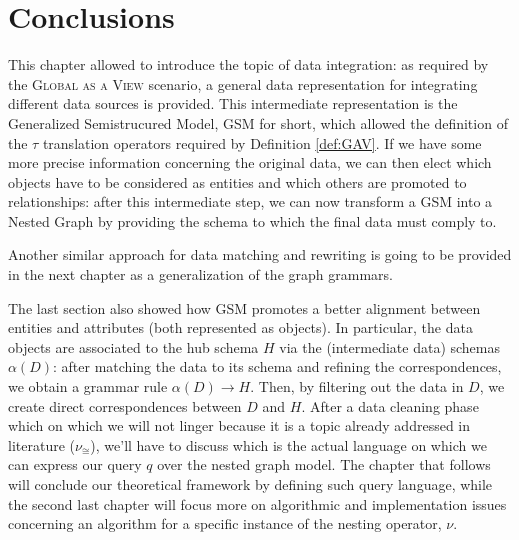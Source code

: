 \section{Conclusions}

This chapter allowed to introduce the topic of data integration: as required by the \textsc{Global as a View} scenario, a general data representation for integrating different data sources is provided. This intermediate representation is the Generalized Semistrucured Model, GSM for short, which allowed the definition of the $\tau$ translation operators required by Definition \vref{def:GAV}. If we have some more precise information concerning the original data, we can then elect which  objects have to be considered as entities and which others are promoted to relationships: after this intermediate step, we can now transform a GSM into a Nested Graph by providing the schema to which the final data must comply to. 

Another similar approach for data matching and rewriting is going to be provided in the next chapter as a generalization of the graph grammars.


The last section also showed how GSM promotes a better alignment between entities and attributes (both represented as objects). %
In particular, the data objects are associated to the hub schema $H$ via the (intermediate data) schemas $\alpha(D)$: after matching the data to its schema and refining the correspondences, we obtain a grammar rule $\alpha(D)\to H$. Then, by filtering out the data in $D$, we create direct correspondences between $D$ and $H$.
After a data cleaning phase which on which we will not linger because it is a topic already addressed in literature ($\nu_\cong$), we'll have to discuss which is the actual language on which we can express our query $q$ over the nested graph model. %
The chapter that follows will conclude our theoretical framework by defining such query language, while the second last chapter will focus more on algorithmic and implementation issues concerning an algorithm for a specific instance of the nesting operator, $\nu$.